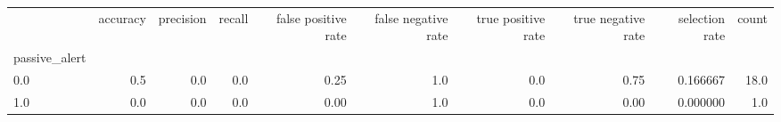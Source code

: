 \begin{tabular}{lrrrrrrrrr}
\toprule
{} &  accuracy &  precision &  recall &  false positive rate &  false negative rate &  true positive rate &  true negative rate &  selection rate &  count \\
passive\_alert &           &            &         &                      &                      &                     &                     &                 &        \\
\midrule
0.0           &       0.5 &        0.0 &     0.0 &                 0.25 &                  1.0 &                 0.0 &                0.75 &        0.166667 &   18.0 \\
1.0           &       0.0 &        0.0 &     0.0 &                 0.00 &                  1.0 &                 0.0 &                0.00 &        0.000000 &    1.0 \\
\bottomrule
\end{tabular}

